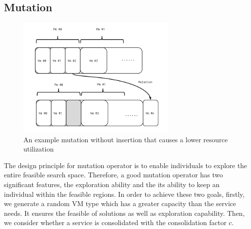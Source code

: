\subsection{Mutation}
\begin{figure}
\centering
  \includegraphics[width=0.7\textwidth]{pics/preliminary/hollow.png}
  \caption{An example mutation without insertion that causes a lower resource utilization}
  \label{fig:hollow}
\end{figure}

The design principle for mutation operator is to enable individuals to explore the entire feasible search space.
Therefore, a good mutation operator has two significant features, the exploration ability and the its ability to keep an individual within the feasible regions. In order to achieve these two goals, firstly, we generate a random VM type which has a greater capacity than the service needs. It ensures the feasible of solutions as well as exploration capability. Then, we consider whether a service is consolidated with the consolidation factor $c$. 

